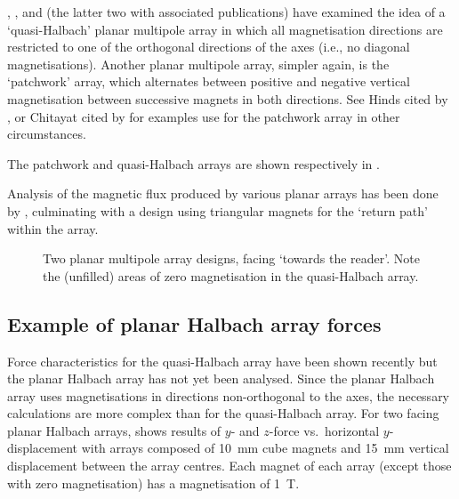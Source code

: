 \documentclass[11pt,a4paper]{memoir}
\begin{document}
\textcite{moser2002-maglev}, \textcite{rovers2009-ietm}, and \textcite{janssen2009-jsdd} (the latter two with associated publications) have examined the idea of a `quasi-Halbach' planar multipole array in which all magnetisation directions are restricted to one of the orthogonal directions of the axes (i.e., no diagonal magnetisations).
Another planar multipole array, simpler again, is the `patchwork' array, which alternates between positive and negative vertical magnetisation between successive magnets in both directions.
See Hinds cited by \textcite{kim1997-thesis}, or Chitayat cited by \textcite{cho2001} for examples use for the patchwork array in other circumstances.

The patchwork and quasi-Halbach arrays are shown respectively in .

Analysis of the magnetic flux produced by various planar arrays has been done by \textcite{cho2001}, culminating with a design using triangular magnets for the `return path' within the array.


\begin{figure}
\centering
{}\hfil
{}
\caption[Two planar multipole array designs.]{Two planar multipole array designs, facing `towards the reader'. Note the (unfilled) areas of zero magnetisation in the quasi-Halbach array.}
\end{figure}

\subsection{Example of planar Halbach array forces}

Force characteristics for the quasi-Halbach array have been shown recently \cite{janssen2009-jsdd} but the planar Halbach array has not yet been analysed.
Since the planar Halbach array uses magnetisations in directions non-orthogonal to the axes, the necessary calculations are more complex than for the quasi-Halbach array.
For two facing planar Halbach arrays,  shows results of $y$- and $z$-force vs.\ horizontal $y$-displacement with arrays composed of \SI{10}{mm} cube magnets and \SI{15}{mm} vertical displacement between the array centres.
Each magnet of each array (except those with zero magnetisation) has a magnetisation of \SI{1}{T}.
\end{document}
